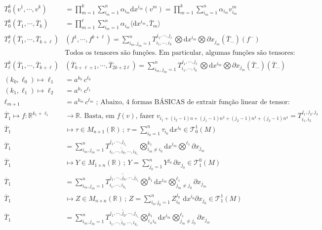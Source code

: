 \documentclass[12pt]{article}
\begin{document}
\begin{align}
  T^k_0(v^1, \cdots, v^k) &= \prod_{m = 1}^k \sum_{i_m = 1}^n \alpha_{i_m} \mathrm{d} x^{i_m} (v^m) = \prod_{m = 1}^k \sum_{i_m = 1}^n \alpha_{i_m} v^m_{i_m} \\
  T^k_0(\overline{T}_1, \cdots, \overline{T}_k) &= \prod_{m = 1}^\ell \sum_{i_m = 1}^n \alpha_{i_m} \langle \mathrm{d} x^{i_m}, \overline{T}_m \rangle \\
  T^k_\ell(\overline{T}_1, \cdots, \overline{T}_{k + \ell})&(f^1, \cdots, f^{k + \ell}) = \sum_{i_m, j_m = 1}^n T_{i_1, \cdots, i_k}^{j_1, \cdots, j_\ell}\, \bigotimes \mathrm{d}x^{i_m} \bigotimes \partial x_{j_m} (\overline{T}_{\cdots})(f^{\cdots}) \\
  &\text{Todos os tensores s\~ao fun\c{c}\~oes. Em particular, algumas fun\c{c}\~oes s\~ao tensores:} \\
  T^k_\ell(\overline{T}_1, \cdots, \overline{T}_{k + \ell})&(\overline{T}_{k+\ell+1}, \cdots, \overline{T}_{2k + 2\ell}) = \sum_{i_m, j_m = 1}^n T_{i_1, \cdots, i_k}^{j_1, \cdots, j_\ell}\, \bigotimes \mathrm{d}x^{i_m} \bigotimes \partial x_{j_m} (\overline{T}_{\cdots})(\overline{T}_{\cdots}) \\
  (k_0, \ell_0) \mapsto \ell_1 &= a^{k_0} \, c^{\ell_0} \\
  (k_1, \ell_1) \mapsto \ell_2 &= a^{k_1} \, c^{\ell_1} \\
  \ell_{m+1} &= a^{k_m} \, c^{\ell_m}\text{ ; Abaixo, }4\text{ formas B\'ASICAS de extrair fun\c{c}\~ao linear de tensor:} \\
  \overline{T}_1 \mapsto f : \mathbb{R}^{k_1 + \ell_1} &\rightarrow \mathbb{R}\text{. Basta, em }f(v)\text{, fazer }v_{i_1 + (i_2 - 1)n + (j_1 - 1)n^2 + (j_2 - 1)n^3 + (j_3 - 1)n^4} = T_{i_1, i_2}^{j_1, j_2, j_3} \\
  \overline{T}_1 &\mapsto \tau \in M_{n \times 1}(\mathbb{R})\,;\,\tau = \sum_{i_0 = 1}^n \tau_{i_0}\,\mathrm{d}x^{i_0} \in \mathcal{T}^1_0(M) \\
  \overline{T}_1 &= \sum_{i_m, j_m = 1}^n T_{i_1, \cdots, \hat{i}_0, \cdots, i_{k_1}}^{j_1, \cdots, j_{\ell_1}} \bigotimes_{i_m \ne i_0}^{k_1} \mathrm{d}x^{i_m} \bigotimes^{\ell_1} \partial x_{j_m} \\
  \overline{T}_1 &\mapsto Y \in M_{1 \times n}(\mathbb{R})\,;\,Y = \sum_{j_0 = 1}^n Y^{j_0}\,\partial x_{j_0} \in \mathcal{T}^0_1(M) \\
  \overline{T}_1 &= \sum_{i_m, j_m = 1}^n T_{i_1, \cdots, i_{k_1}}^{j_1, \cdots, \hat{j}_0, \cdots, j_{\ell_1}} \bigotimes^{k_1} \mathrm{d}x^{i_m} \bigotimes_{j_m \ne j_0}^{\ell_1} \partial x_{j_m} \\
  \overline{T}_1 &\mapsto Z \in M_{n \times n}(\mathbb{R})\,;\,Z = \sum_{i_0, j_0 = 1}^n Z^{j_0}_{i_0}\,\,\mathrm{d}x^{i_0} \partial x_{j_0} \in \mathcal{T}^1_1(M) \\
  \overline{T}_1 &= \sum_{i_m, j_m = 1}^n T_{i_1, \cdots, \hat{i}_0, \cdots, i_{k_1}}^{j_1, \cdots, \hat{j}_0, \cdots, j_{\ell_1}} \bigotimes_{i_ \ne i_0}^{k_1} \mathrm{d}x^{i_m} \bigotimes_{j_m \ne j_0}^{\ell_1} \partial x_{j_m}
\end{align}
\end{document}
